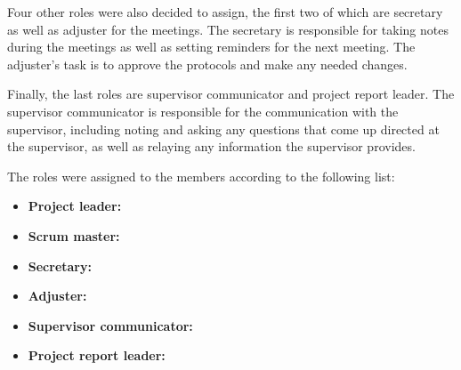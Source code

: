 \documentclass{article}
\begin{document}
        Four other roles were also decided to assign, the first two of which are secretary as well as adjuster for the meetings. The secretary is responsible for taking notes during the meetings as well as setting reminders for the next meeting. The adjuster's task is to approve the protocols and make any needed changes.

        Finally, the last roles are supervisor communicator and project report leader. The supervisor communicator is responsible for the communication with the supervisor, including noting and asking any questions that come up directed at the supervisor, as well as relaying any information the supervisor provides.

        The roles were assigned to the members according to the following list:
        \begin{itemize}
            \item \textbf{Project leader:} \marcus
            \item \textbf{Scrum master:} \felix
            \item \textbf{Secretary:} \martin
            \item \textbf{Adjuster:} \hannes
            \item \textbf{Supervisor communicator:} \jakob
            \item \textbf{Project report leader:} \arvid
        \end{itemize}
    
\end{document}
